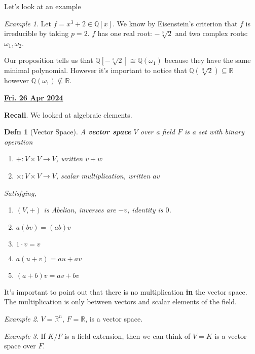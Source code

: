 \documentclass[12pt]{article}
\renewcommand{\date}[1]{\underline{\bf #1}}
\def\Q{{\mathbb Q}}
\def\R{{\mathbb R}}
\newtheorem{definition}{Defn}
\theoremstyle{remark}
\theoremstyle{remark}
\theoremstyle{remark}
\newtheorem{example}{Example}
\theoremstyle{remark}
\theoremstyle{remark}
\begin{document}
Let's look at an example

\begin{example}
  Let $f = x^3 + 2 \in \Q[x]$. We know by Eisenstein's criterion that $f$ is
  irreducible by taking $p = 2$. $f$ has one real root: $-\sqrt[3]{2}$ and two
  complex roots: $\omega_1, \omega_2$.

  Our proposition tells us that $\Q[-\sqrt[3]{2}] \cong \Q(\omega_1)$ because
  they have the same minimal polynomial. However it's important to notice that
  $\Q(\sqrt[3]{2}) \subseteq \R$ however $\Q(\omega_1) \not\subseteq \R$.
\end{example}

\date{Fri. 26 Apr 2024}

{\bf Recall}. We looked at algebraic elements.

\begin{definition}[Vector Space]
  A {\bf vector space} $V$ over a field $F$ is a set with binary operation

  \begin{enumerate}
    \item $+: V \times V \to V$, written $v + w$
    \item $\times: V \times V \to V$, scalar multiplication, written $av$
  \end{enumerate}

  Satisfying,

  \begin{enumerate}
    \item $(V, +)$ is Abelian, inverses are $-v$, identity is $0$.
    \item $a(bv) = (ab)v$
    \item $1 \cdot v = v$
    \item $a(u + v) = au + av$
    \item $(a + b)v = av + bv$
  \end{enumerate}
\end{definition}

It's important to point out that there is no multiplication {\bf in} the vector
space. The multiplication is only between vectors and scalar elements of the
field.

\begin{example}
  $V = \R^n$, $F = \R$, is a vector space.
\end{example}

\begin{example}
  If $K / F$ is a field extension, then we can think of $V = K$ is a vector
  space over $F$.
\end{example}
\end{document}
